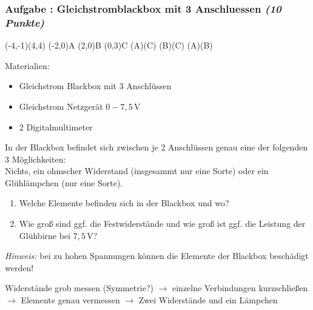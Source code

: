 \documentclass[12pt,a4paper]{article}
\newcommand{\unit}[1]{\,\mathrm{#1}}
\newcommand{\hinweis}{\emph{Hinweis:} }
\newenvironment{abcenum}{\renewcommand{\labelenumi}{(\alph{enumi})} \begin{enumerate}}{\end{enumerate}\renewcommand{\labelenumi}{\theenumi .}}
\newcommand{\skizze}[1]{
\begin{center}
#1
\end{center}
}
\newcounter{numlabel}
\newenvironment{problem}[2]{\stepcounter{numlabel} \vspace{1ex} \subsubsection*{Aufgabe \the\value{numlabel}: #1 \emph{(#2 Punkte)}} \renewcommand{\Currentlabel}{Aufgabe \the\value{numlabel}: #1}}{

}
\begin{document}
\begin{problem}{Gleichstromblackbox mit 3 Anschluessen}{10}
\skizze{
\begin{pspicture}(-4,-1)(4,4)
\pnode(-2,0){A}
\pnode(2,0){B}
\pnode(0,3){C}
\resistor(A)(C){}
\resistor(B)(C){}
\lamp(A)(B){}
\end{pspicture}
}
Materialien:
\begin{itemize}
\item Gleichstrom Blackbox mit 3 Anschlüssen
\item Gleichstrom Netzgerät $0-7,5\unit{V}$
\item 2 Digitalmultimeter
\end{itemize}
In der Blackbox befindet sich zwischen je 2 Anschlüssen genau eine der folgenden 3 Möglichkeiten:\\ Nichts, ein ohmscher Widerstand (insgesammt nur eine Sorte) oder ein Glühlämpchen (nur eine Sorte).
\begin{abcenum}
\item Welche Elemente befinden sich in der Blackbox und wo?
\item Wie groß sind ggf. die Festwiderstände und wie groß ist ggf. die Leistung der Glühbirne bei $7,5\unit{V}$?
\end{abcenum}
\hinweis bei zu hohen Spannungen können die Elemente der Blackbox beschädigt werden!
\begin{expsolution}
Widerstände grob messen (Symmetrie?) $\rightarrow$ einzelne Verbindungen kurzschließen $\rightarrow$ Elemente genau vermessen $\rightarrow$ Zwei Widerstände und ein Lämpchen
\end{expsolution}
\end{problem}
\end{document}
